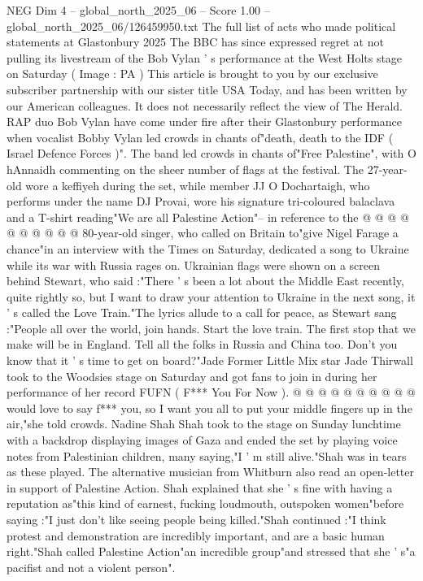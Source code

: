 \begin{textsample}{NEG Dim 4 – global\_north\_2025\_06 – Score 1.00 – global\_north\_2025\_06/126459950.txt}  \label{ex:f4_neg_077}
The full list of acts who made political statements at Glastonbury 2025 The BBC has since expressed regret at not pulling its livestream of the Bob Vylan ' s performance at the West Holts stage on Saturday ( Image : PA ) This article is brought to you by our exclusive subscriber partnership with our sister title USA Today, and has been written by our American colleagues.
It does not necessarily reflect the view of The Herald.
RAP duo Bob Vylan have come under fire after their Glastonbury performance when vocalist Bobby Vylan led crowds in chants of"death, death to the IDF ( Israel Defence Forces )".
The band led crowds in chants of"Free Palestine", with O hAnnaidh commenting on the sheer number of flags at the festival.
The 27-year-old wore a keffiyeh during the set, while member JJ O Dochartaigh, who performs under the name DJ Provai, wore his signature tri-coloured balaclava and a T-shirt reading"We are all Palestine Action"-- in reference to the @ @ @ @ @ @ @ @ @ @ 80-year-old singer, who called on Britain to"give Nigel Farage a chance"in an interview with the Times on Saturday, dedicated a song to Ukraine while its war with Russia rages on.
Ukrainian flags were shown on a screen behind Stewart, who said :"There ' s been a lot about the Middle East recently, quite rightly so, but I want to draw your attention to Ukraine in the next song, it ' s called the Love Train."The lyrics allude to a call for peace, as Stewart sang :"People all over the world, join hands.
Start the love train.
The first stop that we make will be in England.
Tell all the folks in Russia and China too.
Don't you know that it ' s time to get on board?"Jade Former Little Mix star Jade Thirwall took to the Woodsies stage on Saturday and got fans to join in during her performance of her record FUFN ( F*** You For Now ). @ @ @ @ @ @ @ @ @ @ would love to say f*** you, so I want you all to put your middle fingers up in the air,"she told crowds.
Nadine Shah Shah took to the stage on Sunday lunchtime with a backdrop displaying images of Gaza and ended the set by playing voice notes from Palestinian children, many saying,"I ' m still alive."Shah was in tears as these played.
The alternative musician from Whitburn also read an open-letter in support of Palestine Action.
Shah explained that she ' s fine with having a reputation as"this kind of earnest, fucking loudmouth, outspoken women"before saying :"I just don't like seeing people being killed."Shah continued :"I think protest and demonstration are incredibly important, and are a basic human right."Shah called Palestine Action"an incredible group"and stressed that she ' s"a pacifist and not a violent person".

\end{textsample}
